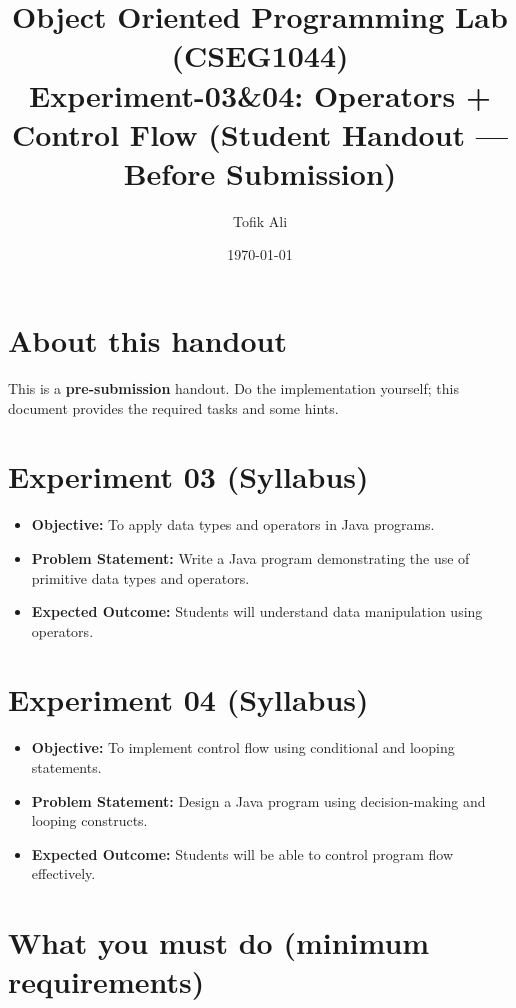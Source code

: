 \documentclass[11pt]{article}
\title{Object Oriented Programming Lab (CSEG1044)\\Experiment-03\&04: Operators + Control Flow (Student Handout --- Before Submission)}
\author{Tofik Ali}
\date{\today}
\begin{document}
\maketitle
\tableofcontents

\section{About this handout}
This is a \textbf{pre-submission} handout.
Do the implementation yourself; this document provides the required tasks and some hints.

\section{Experiment 03 (Syllabus)}
\begin{itemize}[leftmargin=*]
  \item \textbf{Objective:} To apply data types and operators in Java programs.
  \item \textbf{Problem Statement:} Write a Java program demonstrating the use of primitive data types and operators.
  \item \textbf{Expected Outcome:} Students will understand data manipulation using operators.
\end{itemize}

\section{Experiment 04 (Syllabus)}
\begin{itemize}[leftmargin=*]
  \item \textbf{Objective:} To implement control flow using conditional and looping statements.
  \item \textbf{Problem Statement:} Design a Java program using decision-making and looping constructs.
  \item \textbf{Expected Outcome:} Students will be able to control program flow effectively.
\end{itemize}

\section{What you must do (minimum requirements)}
\end{document}
